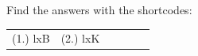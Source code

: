 \label{m39341**end}
\par {} Find the answers with the shortcodes:
\par \begin{tabular}[h]{cccccc}
(1.) lxB  &  (2.) lxK  & \end{tabular}
% 
%     
%     
%     
%     
%     
%     
\label{m39348*uid172}
